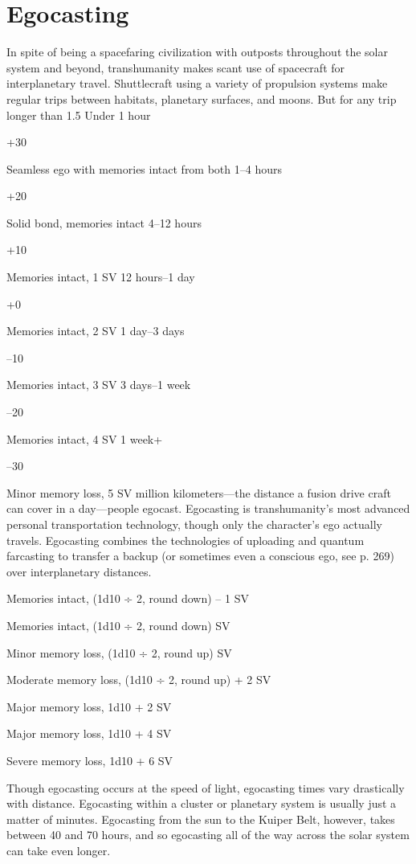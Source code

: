 \section{Egocasting}

In spite of being a spacefaring civilization with outposts
throughout the solar system and beyond, transhumanity
makes scant use of spacecraft for interplanetary
travel. Shuttlecraft using a variety of propulsion
systems make regular trips between habitats, planetary 
surfaces, and moons. But for any trip longer than 1.5 
Under 1 hour

+30

Seamless ego with memories intact from both
1–4 hours

+20

Solid bond, memories intact
4–12 hours

+10

Memories intact, 1 SV
12 hours–1 day

+0

Memories intact, 2 SV
1 day–3 days

–10

Memories intact, 3 SV
3 days–1 week

–20

Memories intact, 4 SV
1 week+

–30

Minor memory loss, 5 SV
million kilometers—the distance a fusion drive craft 
can cover in a day—people egocast.
Egocasting is transhumanity's most advanced 
personal transportation technology, though only the 
character's ego actually travels. Egocasting combines 
the technologies of uploading and quantum farcasting 
to transfer a backup (or sometimes even a conscious 
ego, see p. 269) over interplanetary distances.

Memories intact, (1d10 ÷ 2, round down) – 1 SV

Memories intact, (1d10 ÷ 2, round down) SV

Minor memory loss, (1d10 ÷ 2, round up) SV

Moderate memory loss, (1d10 ÷ 2, round up) + 2 SV

Major memory loss, 1d10 + 2 SV

Major memory loss, 1d10 + 4 SV

Severe memory loss, 1d10 + 6 SV

Though egocasting occurs at the speed of light, 
egocasting times vary drastically with distance. Egocasting
within a cluster or planetary system is usually
just a matter of minutes. Egocasting from the sun to 
the Kuiper Belt, however, takes between 40 and 70 
hours, and so egocasting all of the way across the 
solar system can take even longer.

